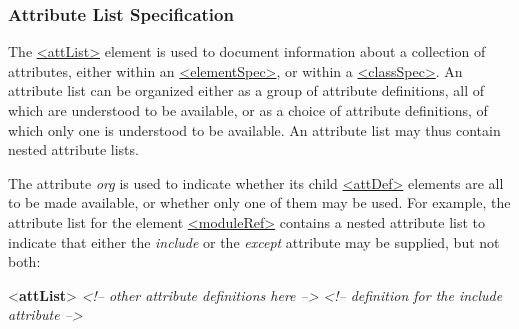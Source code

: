 \subsubsection[{Attribute List Specification}]{Attribute List Specification}\label{TDATT}\par
The \hyperref[TEI.attList]{<attList>} element is used to document information about a collection of attributes, either within an \hyperref[TEI.elementSpec]{<elementSpec>}, or within a \hyperref[TEI.classSpec]{<classSpec>}. An attribute list can be organized either as a group of attribute definitions, all of which are understood to be available, or as a choice of attribute definitions, of which only one is understood to be available. An attribute list may thus contain nested attribute lists.\par
The attribute {\itshape org} is used to indicate whether its child \hyperref[TEI.attDef]{<attDef>} elements are all to be made available, or whether only one of them may be used. For example, the attribute list for the element \hyperref[TEI.moduleRef]{<moduleRef>} contains a nested attribute list to indicate that either the {\itshape include} or the {\itshape except} attribute may be supplied, but not both: \par\bgroup{}\exampleFont \begin{shaded}\noindent\mbox{}{<\textbf{attList}>}\mbox{}\newline 
\textit{<!-- other attribute definitions here -->}\mbox{}\newline 
{}\mbox{}\newline 
\hspace*{1em}\mbox{}\newline 
\textit{<!-- definition for the include attribute -->}\mbox{}\newline 
\hspace*{1em}\mbox{}\newline 
\hspace*{1em}\mbox{}\newline 

\end{shaded}
